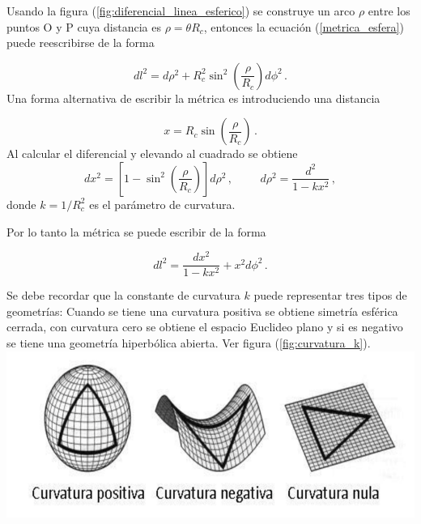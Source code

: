 
Usando la figura (\ref{fig:diferencial_linea_esferico}) se construye un arco $\rho$ entre los puntos O y P cuya distancia es $\rho=\theta R_{c}$, entonces la ecuación (\ref{metrica_esfera}) puede reescribirse de la forma

\begin{equation}
dl^{2}=d\rho^{2}+R_{c}^{2}\sin^{2}\left(\frac{\rho}{R_{c}} \right)d\phi^{2} \,.
\end{equation}
%
Una forma alternativa de escribir la métrica es introduciendo una distancia

\begin{equation}
x=R_{c}\sin\left(\frac{\rho}{R_{c}} \right) \,.
\end{equation}
%
Al calcular el diferencial y elevando al cuadrado se obtiene
%
\begin{equation}
dx^{2}=\left[1-\sin^{2}\left( \frac{\rho}{R_{c}}\right) \right]d\rho^{2}  \,, \hspace{1cm} d\rho^{2}=\frac{d^{2}}{1-kx^{2}} \,,
\end{equation}
%
donde $k=1/R_{c}^{2}$ es el parámetro de curvatura.

Por lo tanto la métrica se puede escribir de la forma 

\begin{equation}
dl^{2}=\frac{dx^{2}}{1-kx^{2}}+x^{2}d\phi^{2} \,.
\end{equation}

Se debe recordar que la constante de curvatura $k$ puede representar tres tipos de geometrías: Cuando se tiene una curvatura positiva se obtiene simetría esférica cerrada, con curvatura cero se obtiene el espacio Euclideo plano y si es negativo se tiene una geometría hiperbólica abierta. Ver figura (\ref{fig:curvatura_k}).\\

\includegraphics[scale=.4]{./figures/2_theoretical_framework/curvatura_k.png}
\label{fig:curvatura_k}

